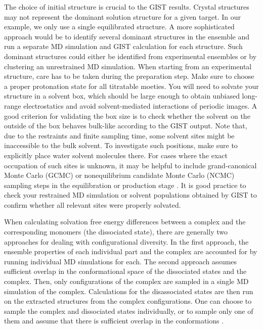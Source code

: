 \documentclass[9pt,tutorial]{livecoms}
\begin{document}
The choice of initial structure is crucial to the GIST results.
Crystal structures may not represent the dominant solution structure for a given target.
In our example, we only use a single equilibrated structure.
A more sophisticated approach would be to identify several dominant structures in the ensemble and run a separate MD simulation and GIST calculation for each structure. 
Such dominant structures could either be identified from experimental ensembles or by clustering an unrestrained MD simulation. 
When starting from an experimental structure, care has to be taken during the preparation step.
Make sure to choose a proper protonation state for all titratable moeties.
You will need to solvate your structure in a solvent box, which should be large enough to obtain unbiased long-range electrostatics and avoid solvent-mediated interactions of periodic images.
A good criterion for validating the box size is to check whether the solvent on the outside of the box behaves bulk-like according to the GIST output.
Note that, due to the restraints and finite sampling time, some solvent sites might be inaccessible to the bulk solvent.
To investigate such positions, make sure to explicitly place water solvent molecules there. 
For cases where the exact occupation of such sites is unknown, it may be helpful to include grand-canonical Monte Carlo (GCMC) or nonequilibrium candidate Monte Carlo (NCMC) sampling steps in the equilibration or production stage \cite{Ge-GCMC2022,Melling-NCMC2023}.
It is good practice to check your restrained MD simulation or solvent populations obtained by GIST to confirm whether all relevant sites were properly solvated.

When calculating solvation free energy differences between a complex and the corresponding monomers (the dissociated state), there are generally two approaches for dealing with configurational diversity. 
In the first approach, the ensemble properties of each individual part and the complex are accounted for by running individual MD simulations for each.
The second approach assumes sufficient overlap in the conformational space of the dissociated states and the complex. 
Then, only configurations of the complex are sampled in a single MD simulation of the complex. 
Calculations for the disassociated states are then run on the extracted structures from the complex configurations.
One can choose to sample the complex and dissociated states individually, or to sample only one of them and assume that there is sufficient overlap in the conformations \cite{Genheden-EndState2012,Wang-MMPBSA2019}. 
\end{document}
